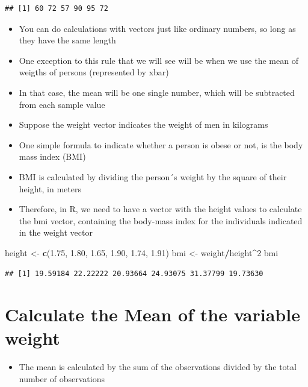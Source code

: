 \documentclass[
]{book}
\newenvironment{Shaded}{\begin{snugshade}}{\end{snugshade}}
\newcommand{\DecValTok}[1]{\textcolor[rgb]{0.00,0.00,0.81}{#1}}
\newcommand{\FloatTok}[1]{\textcolor[rgb]{0.00,0.00,0.81}{#1}}
\newcommand{\FunctionTok}[1]{\textcolor[rgb]{0.13,0.29,0.53}{\textbf{#1}}}
\newcommand{\NormalTok}[1]{#1}
\newcommand{\OtherTok}[1]{\textcolor[rgb]{0.56,0.35,0.01}{#1}}
\newcommand{\SpecialCharTok}[1]{\textcolor[rgb]{0.81,0.36,0.00}{\textbf{#1}}}
\providecommand{\tightlist}{%
  \setlength{\itemsep}{0pt}\setlength{\parskip}{0pt}}
\begin{document}
\begin{verbatim}
## [1] 60 72 57 90 95 72
\end{verbatim}

\begin{itemize}
\item
  You can do calculations with vectors just like ordinary numbers, so long as they have the same length
\item
  One exception to this rule that we will see will be when we use the mean of weigths of persons (represented by xbar)
\item
  In that case, the mean will be one single number, which will be subtracted from each sample value
\item
  Suppose the weight vector indicates the weight of men in kilograms
\item
  One simple formula to indicate whether a person is obese or not, is the body mass index (BMI)
\item
  BMI is calculated by dividing the person´s weight by the square of their height, in meters
\item
  Therefore, in R, we need to have a vector with the height values to calculate the bmi vector, containing the body-mass index for the individuals indicated in the weight vector
\end{itemize}

\begin{Shaded}
\begin{Highlighting}[]
\NormalTok{height }\OtherTok{\textless{}{-}} \FunctionTok{c}\NormalTok{(}\FloatTok{1.75}\NormalTok{, }\FloatTok{1.80}\NormalTok{, }\FloatTok{1.65}\NormalTok{, }\FloatTok{1.90}\NormalTok{, }\FloatTok{1.74}\NormalTok{, }\FloatTok{1.91}\NormalTok{)}
\NormalTok{bmi }\OtherTok{\textless{}{-}}\NormalTok{ weight}\SpecialCharTok{/}\NormalTok{height}\SpecialCharTok{\^{}}\DecValTok{2}
\NormalTok{bmi}
\end{Highlighting}
\end{Shaded}

\begin{verbatim}
## [1] 19.59184 22.22222 20.93664 24.93075 31.37799 19.73630
\end{verbatim}

\section{Calculate the Mean of the variable weight}\label{calculate-the-mean-of-the-variable-weight}

\begin{itemize}
\tightlist
\item
  The mean is calculated by the sum of the observations divided by the total number of observations
\end{itemize}
\end{document}
